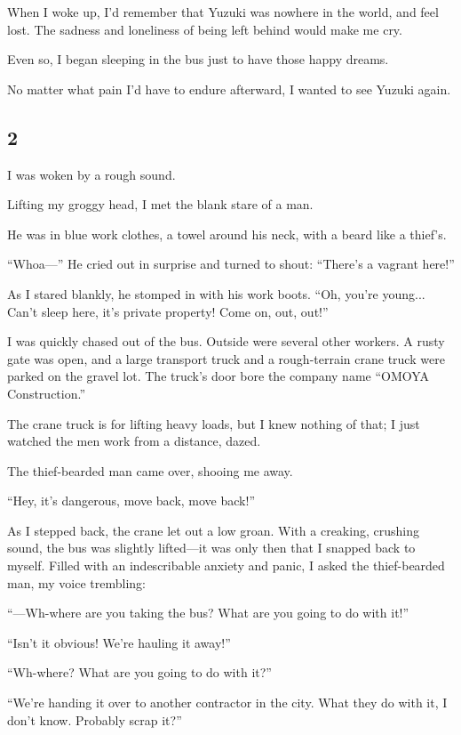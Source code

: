 \documentclass[
    a4paper,
    12pt,
    twoside,
    openany,
    UTF8,
    fontset=windows
]{ctexbook}
\begin{document}
When I woke up, I'd remember that Yuzuki was nowhere in the world, and feel lost. The sadness and loneliness of being left behind would make me cry.

Even so, I began sleeping in the bus just to have those happy dreams.

No matter what pain I'd have to endure afterward, I wanted to see Yuzuki again.


\subsection*{2}

I was woken by a rough sound.

Lifting my groggy head, I met the blank stare of a man.

He was in blue work clothes, a towel around his neck, with a beard like a thief's.

``Whoa---'' He cried out in surprise and turned to shout: ``There's a vagrant here!''

As I stared blankly, he stomped in with his work boots. ``Oh, you're young... Can't sleep here, it's private property! Come on, out, out!''

I was quickly chased out of the bus. Outside were several other workers. A rusty gate was open, and a large transport truck and a rough-terrain crane truck were parked on the gravel lot. The truck's door bore the company name ``OMOYA Construction.''

The crane truck is for lifting heavy loads, but I knew nothing of that; I just watched the men work from a distance, dazed.

The thief-bearded man came over, shooing me away.

``Hey, it's dangerous, move back, move back!''

As I stepped back, the crane let out a low groan. With a creaking, crushing sound, the bus was slightly lifted---it was only then that I snapped back to myself. Filled with an indescribable anxiety and panic, I asked the thief-bearded man, my voice trembling:

``---Wh-where are you taking the bus? What are you going to do with it!''

``Isn't it obvious! We're hauling it away!''

``Wh-where? What are you going to do with it?''

``We're handing it over to another contractor in the city. What they do with it, I don't know. Probably scrap it?''
\end{document}
